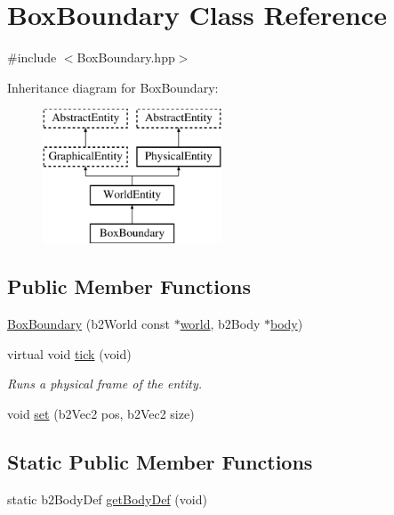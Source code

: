 \hypertarget{class_box_boundary}{}\section{Box\+Boundary Class Reference}
\label{class_box_boundary}


{\ttfamily \#include $<$Box\+Boundary.\+hpp$>$}

Inheritance diagram for Box\+Boundary\+:\begin{figure}[H]
\begin{center}
\leavevmode
\includegraphics[height=4.000000cm]{class_box_boundary}
\end{center}
\end{figure}
\subsection*{Public Member Functions}
\begin{DoxyCompactItemize}
\item 
\hyperlink{class_box_boundary_aa0fb2fc1d213abc552450e1787c876fd}{Box\+Boundary} (b2\+World const $\ast$\hyperlink{class_physical_entity_ae6c23c3817c4d7f9a867abed05cd7834}{world}, b2\+Body $\ast$\hyperlink{class_physical_entity_a91a5016393dd890c490b329abd938ec7}{body})
\item 
virtual void \hyperlink{class_box_boundary_a5f174130498e1cfeb16bd37dfa8bceba}{tick} (void)
\begin{DoxyCompactList}\small\item\em Runs a physical frame of the entity. \end{DoxyCompactList}\item 
void \hyperlink{class_box_boundary_adedcb98d6617022c19aef0448bf546c5}{set} (b2\+Vec2 pos, b2\+Vec2 size)
\end{DoxyCompactItemize}
\subsection*{Static Public Member Functions}
\begin{DoxyCompactItemize}
\item 
static b2\+Body\+Def \hyperlink{class_box_boundary_a9c23a7955836409c8bc07c3d62cc0637}{get\+Body\+Def} (void)
\end{DoxyCompactItemize}
